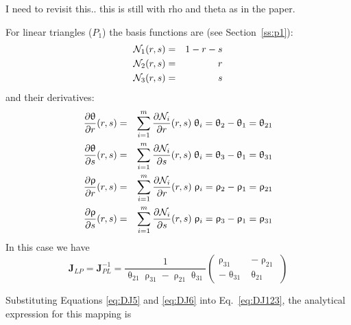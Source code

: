 {\color{red} I need to revisit this.. this is still with rho and theta as in the paper. }

For linear triangles ($P_1$) the basis functions are (see Section~\ref{ss:p1}):
\begin{eqnarray}
{\mathcal{N}}_1(r,s)&=&1-r-s \nonumber\\
{\mathcal{N}}_2(r,s)&=&r  \nonumber\\
{\mathcal{N}}_3(r,s)&=&s \nonumber
\end{eqnarray}
and their derivatives:
\begin{eqnarray}
\frac{\partial\uptheta}{\partial r}(r,s) &=& \sum_{i=1}^m \frac{\partial{\mathcal{N}}_i}{\partial r}(r,s)\; \uptheta_i = \uptheta_2-\uptheta_1 = \uptheta_{21}\nonumber\\
\frac{\partial\uptheta}{\partial s}(r,s) &=& \sum_{i=1}^m \frac{\partial{\mathcal{N}}_i}{\partial s}(r,s)\; \uptheta_i = \uptheta_3-\uptheta_1 = \uptheta_{31}\nonumber\\
\frac{\partial\uprho}{\partial r}(r,s)   &=& \sum_{i=1}^m \frac{\partial{\mathcal{N}}_i}{\partial r}(r,s)\; \uprho_i   = \uprho_2-\uprho_1 = \uprho_{21}\nonumber\\
\frac{\partial\uprho}{\partial s}(r,s)   &=& \sum_{i=1}^m \frac{\partial{\mathcal{N}}_i}{\partial s}(r,s)\; \uprho_i   = \uprho_3-\uprho_1 = \uprho_{31}\nonumber
\end{eqnarray}
In this case we have 
\begin{equation}
\boxed{
{\bm J}_{LP}={\bm J}_{PL}^{-1} = \frac{1}{\uptheta_{21}\uprho_{31}-\uprho_{21}\uptheta_{31}} 
\left(
\begin{array}{cc}
\uprho_{31} & -\uprho_{21} \\
-\uptheta_{31} & \uptheta_{21}
\end{array}
\right)}
\label{eq:DJ5}
\end{equation}

Substituting Equations \eqref{eq:DJ5} and \eqref{eq:DJ6} into Eq.~\eqref{eq:DJ123}, the analytical expression for this mapping is

